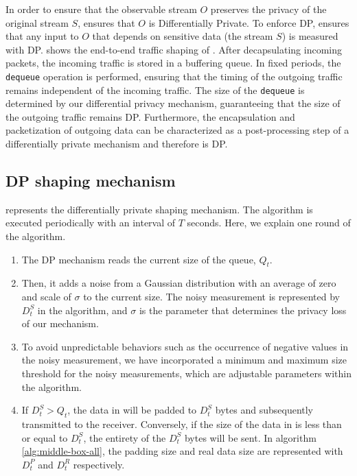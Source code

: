 In order to ensure that the observable stream $O$ preserves the privacy of the
original stream $S$, {\sys} ensures that $O$ is Differentially Private.
To enforce DP, {\sys} ensures that any input to $O$ that depends on sensitive
data (the stream $S$) is measured with DP.
 shows the end-to-end traffic shaping of {\sys}.
After decapsulating incoming packets, the incoming traffic is stored in a
buffering queue. In fixed periods, the \texttt{dequeue} operation is performed,
ensuring that the timing of the outgoing traffic remains independent of the
incoming traffic. The size of the \texttt{dequeue} is determined by our
differential privacy mechanism, guaranteeing that the size of the outgoing
traffic remains DP.
Furthermore, the encapsulation and packetization of outgoing data can be
characterized as a post-processing step of a differentially private mechanism
and therefore is DP.
\fi


\subsection{DP shaping mechanism}
\label{subsec:dp-shaping}

 

 represents the differentially private shaping
mechanism.  The algorithm is executed periodically with an interval of $T$
seconds.  Here, we explain one round of the algorithm.
\begin{enumerate}
  \item The DP mechanism reads the current size of the queue, $Q_t$.
  \item Then, it adds a noise from a Gaussian distribution with an average of
  zero and scale of ${\sigma}$ to the current size. The noisy measurement is
  represented by $D^S_t$ in the algorithm, and $\sigma$ is the parameter that
  determines the privacy loss of our mechanism.
  \item To avoid unpredictable behaviors such as the occurrence of negative
  values in the noisy measurement, we have incorporated a minimum and maximum
  size threshold for the noisy measurements, which are adjustable parameters
  within the algorithm.
  \item If $D^S_t > Q_t$, the data in {\unshapedQ} will be padded to $D^S_t$
  bytes and subsequently transmitted to the receiver.
  Conversely, if the size of the data in {\unshapedQ} is less than or equal to
  $D^S_t$, the entirety of the $D^S_t$ bytes will be sent.  In algorithm
  \ref{alg:middle-box-all}, the padding size and real data size are represented
  with $D^P_t$ and $D^R_t$ respectively.
\end{enumerate}
\fi

